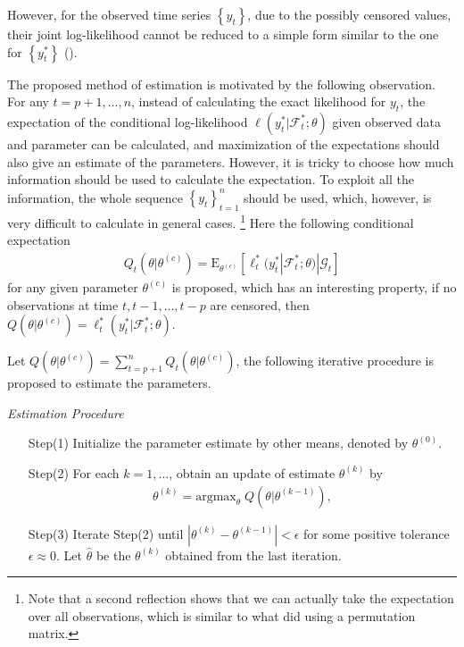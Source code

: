 \documentclass[a4paper,12pt]{article}
\newcommand{\E}{\mathop{\mathbb{E}}}
\def \E{\mbox{E}}
\def \argmax{\mbox{argmax}}
\def \F {\mathcal{F}}
\def \G {\mathcal{G}}
\begin{document}
However, for the observed time series $\left\{ y_t \right\}$, due to the possibly censored values, their joint log-likelihood cannot be reduced to a simple form similar to the one for $\left\{ y_t^* \right\}$ (\citet{ZegerBrookmeyer1986}).

The proposed method of estimation is motivated by the following observation. 
For any $t=p+1,\dots,n$,
instead of calculating the exact likelihood for $y_t$, 
the expectation of the conditional log-likelihood $\ell(y_t^*|\F_t^*;\theta)$ 
given observed data and parameter can be calculated, and maximization of the expectations should also give an estimate of the parameters.
However, it is tricky to choose how much information should be used to calculate the expectation. 
To exploit all the information, 
the whole sequence $\left\{y_t\right\}_{t=1}^n$ should be used, 
which, however, is very difficult to calculate in general cases. \footnote{Note that a second reflection shows that we can actually take the expectation over all observations, which is similar to what \citet{ParkGentonGhosh2007} did using a permutation matrix.}
Here the following conditional expectation
\begin{align}
Q_t(\theta|\theta^{(c)})=\E_{\theta^{(c)}}\left[ \ell_t^*(y_t^*|\F_t^*;\theta)|\G_t \right]
\label{qt}
\end{align}
for any given parameter $\theta^{(c)}$ is proposed,
which has an interesting property, if no observations at time $t,t-1,\dots,t-p$ are censored, then 
$Q(\theta|\theta^{(c)})=\ell_t^*(y_t^*|\F_t^*;\theta)$.

Let $Q(\theta|\theta^{(c)})=\sum_{t=p+1}^n Q_t(\theta|\theta^{(c)})$, the following iterative procedure is proposed to estimate the parameters.

\vspace{0.4cm}
{\em Estimation Procedure}
\begin{enumerate}
\item[Step(1)] \label{iStep}
Initialize the parameter estimate by other means, denoted by $\theta^{(0)}$.
\item[Step(2)] \label{mStep} 
For each $k=1,\dots$, obtain an update of estimate $\theta^{(k)}$ by
\begin{align}
\theta^{(k)} = \argmax_{\theta} \; Q(\theta|\theta^{(k-1)}),
\label{maxQ}
\end{align}
\item[Step(3)] \label{iterStep}
Iterate Step(2) until $|\theta^{(k)} - \theta^{(k-1)}|<\epsilon$ for some positive tolerance $\epsilon \approx 0$.
Let $\hat{\theta}$ be the $\theta^{(k)}$ obtained from the last iteration.
\end{enumerate}
\end{document}
